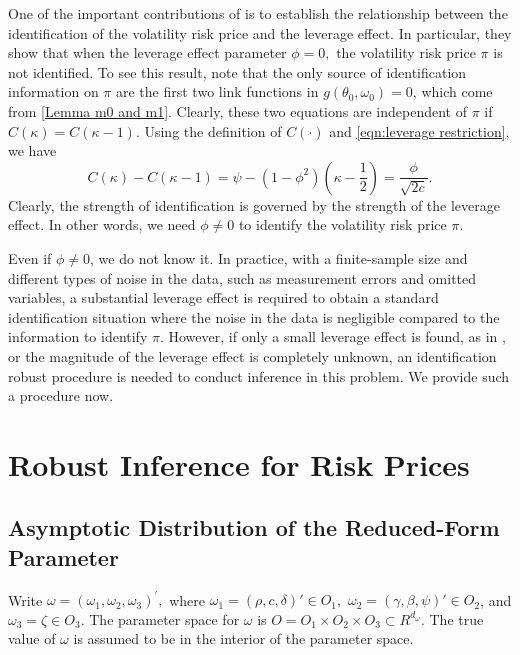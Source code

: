 One of the important contributions of \textcite{han2018leverage} is to establish the relationship between the identification of the volatility risk price and the leverage effect. In particular, they show that when the leverage effect parameter $\phi =0,$ the volatility risk price $\pi $ is not identified. To see this result, note that the only source of identification information on $\pi $ are the first two link functions in $g(\theta _{0},\omega _{0})=0$, which come from \cref{Lemma m0 and m1}. Clearly, these two equations are independent of $\pi$ if $C(\kappa )=C(\kappa -1)$. Using the definition of $C(\cdot)$ and \cref{eqn:leverage restriction}, we have 
%
\begin{equation}
    C(\kappa )-C(\kappa -1)=\psi -(1-\phi ^{2})\left( \kappa -\frac{1}{2}\right) = \frac{\phi}{\sqrt{2 c}}.
\end{equation}
%
Clearly, the strength of identification is governed by the strength of the leverage effect.
In other words, we need $\phi \neq 0$ to identify the volatility risk price $\pi$.

Even if $\phi \neq 0$, we do not know it. In practice, with a finite-sample size and different types of noise in the data, such as measurement errors and omitted variables, a substantial leverage effect is required to obtain a standard identification situation where the noise in the data is negligible compared to the information to identify $\pi$. However, if only a small leverage effect is found, as in \textcites{bandi2012timevarying, aitsahalia2013leverage}, or the magnitude of the leverage effect is completely unknown, an identification robust procedure is needed to conduct inference in this problem. We provide such a procedure now.

\section{Robust Inference for Risk Prices}\label{sec:robust inference}

\subsection{Asymptotic Distribution of the Reduced-Form Parameter}

Write $\omega = (\omega _{1},\omega _{2},\omega _{3})^{\prime },$ where $\omega _{1}=(\rho ,c,\delta)' \in O_{1},$ $\omega _{2}=(\gamma ,\beta ,\psi)' \in O_{2}$, and $\omega _{3}=\zeta \in O_{3}.$ The parameter space for $ \omega $ is $O=O_{1}\times O_{2}\times O_{3}\subset R^{d_{\omega }}$. The true value of $\omega $ is assumed to be in the interior of the parameter
space.

